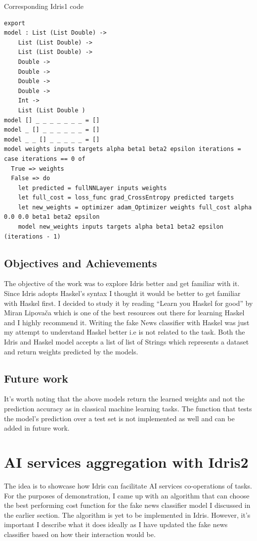 \documentclass[]{report}
\begin{document}
Corresponding Idris1 code
\begin{verbatim}
export
model : List (List Double) -> 
	List (List Double) -> 
	List (List Double) -> 
	Double -> 
	Double -> 
	Double -> 
	Double -> 
	Int -> 
	List (List Double )
model [] _ _ _ _ _ _ _ = []
model _ [] _ _ _ _ _ _ = []
model _ _ [] _ _ _ _ _ = []
model weights inputs targets alpha beta1 beta2 epsilon iterations = case iterations == 0 of                         
  True => weights
  False => do
    let predicted = fullNNLayer inputs weights
    let full_cost = loss_func grad_CrossEntropy predicted targets 
    let new_weights = optimizer adam_Optimizer weights full_cost alpha 0.0 0.0 beta1 beta2 epsilon 
    model new_weights inputs targets alpha beta1 beta2 epsilon (iterations - 1)
\end{verbatim}

\subsection{Objectives and Achievements}
The objective of the work was to explore Idris better and get familiar with it. 
Since Idris adopts Haskel's syntax I thought it would be better to get familiar with Haskel first. 
I decided to study it by reading “Learn you Haskel for good” by Miran Lipovača 
which is one of the best resources  out there for learning Haskel and I highly recommend it. 
Writing the fake News classifier with Haskel was just my attempt to understand Haskel better i.e 
is not related  to the task. Both the Idris and Haskel model accepts a list of 
list of Strings which represents a dataset and return weights predicted by the models. 

\subsection{Future work}
It's worth noting that the above models return the learned weights and not the prediction 
accuracy as in classical machine learning tasks. The function that tests the model's 
prediction over a test set is not implemented as well and can be added in future work.  


\section{AI services aggregation with Idris2}
The idea is to showcase how Idris can facilitate AI services co-operations of tasks. 
For the purposes of demonstration, I came up with an algorithm that can choose the best performing 
cost function for the fake news classifier model I discussed in the earlier section. 
The algorithm is yet to be implemented in Idris. However, it's important I describe 
what it does ideally as I have updated the fake news classifier based on how their interaction would be. 
\end{document}
